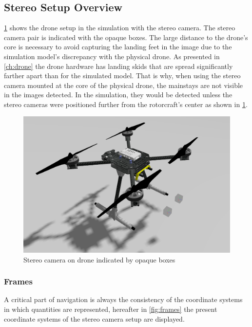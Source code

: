 \subsection{Stereo Setup Overview}

\cref{fig:drone_sim_setup} shows the drone setup in the simulation with the stereo camera. The stereo camera pair is indicated with the opaque boxes. The large distance to the drone's core is necessary to avoid capturing the landing feet in the image due to the simulation model's discrepancy with the physical drone. As presented in \cref{ch:drone} the drone hardware has landing skids that are spread significantly farther apart than for the simulated model. That is why, when using the stereo camera mounted at the core of the physical drone, the mainstays are not visible in the images detected. In the simulation, they would be detected unless the stereo cameras were positioned further from the rotorcraft's center as shown in \cref{fig:drone_sim_setup}. 

\begin{figure}
    \centering
    \includegraphics[scale=0.32]{images/stereo_camera_depth/drone_with_stereo_cam.png}
    \caption{Stereo camera on drone indicated by opaque boxes}
    \label{fig:drone_sim_setup}
\end{figure}

\subsubsection{Frames}

A critical part of navigation is always the consistency of the coordinate systems in which quantities are represented, hereafter in \cref{fig:frames} the present coordinate systems of the stereo camera setup are displayed. 

